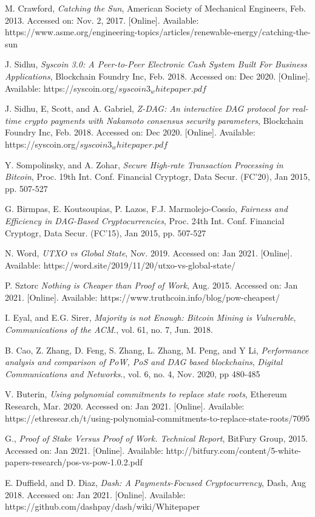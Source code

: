 \documentclass[peerreview]{ieeesyscoin}
\begin{document}
\begin{thebibliography}{00}


 M. Crawford, \textit{Catching the Sun}, American Society of Mechanical Engineers, Feb. 2013. Accessed on: Nov. 2, 2017. [Online]. Available: https://www.asme.org/engineering-topics/articles/renewable-energy/catching-the-sun


 J. Sidhu, \textit{Syscoin 3.0: A Peer-to-Peer Electronic Cash System Built For Business Applications}, Blockchain Foundry Inc, Feb. 2018. Accessed on: Dec 2020. [Online]. Available: https://syscoin.org/$syscoin3_whitepaper.pdf$

 J. Sidhu, E, Scott, and A. Gabriel, \textit{Z-DAG: An interactive DAG protocol for real-time crypto payments with Nakamoto consensus security parameters}, Blockchain Foundry Inc, Feb. 2018. Accessed on: Dec 2020. [Online]. Available: https://syscoin.org/$syscoin3_whitepaper.pdf$


 Y. Sompolinsky, and A. Zohar, \textit{Secure High-rate Transaction Processing in Bitcoin}, Proc. 19th Int. Conf. Financial Cryptogr, Data Secur. (FC’20), Jan 2015, pp. 507-527

 G. Birmpas, E. Koutsoupias, P. Lazos, F.J. Marmolejo-Cossío, \textit{Fairness and Efficiency in DAG-Based Cryptocurrencies}, Proc. 24th Int. Conf. Financial Cryptogr, Data Secur. (FC’15), Jan 2015, pp. 507-527


 N. Word, \textit{UTXO vs Global State}, Nov. 2019. Accessed on: Jan 2021. [Online]. Available: https://word.site/2019/11/20/utxo-vs-global-state/

 P. Sztorc \textit{Nothing is Cheaper than Proof of Work}, Aug. 2015. Accessed on: Jan 2021. [Online]. Available: https://www.truthcoin.info/blog/pow-cheapest/

 I. Eyal, and E.G. Sirer, \textit{Majority is not Enough: Bitcoin Mining is Vulnerable}, \emph{Communications of the ACM}., vol. 61, no. 7, Jun. 2018.

 B. Cao, Z. Zhang, D. Feng, S. Zhang, L. Zhang, M. Peng, and
Y Li, \textit{Performance analysis and comparison of PoW, PoS and DAG based blockchains}, \emph{Digital Communications and Networks}., vol. 6, no. 4, Nov. 2020, pp 480-485

 V. Buterin, \textit{Using polynomial commitments to replace state roots}, Ethereum Research, Mar. 2020. Accessed on: Jan 2021. [Online]. Available: https://ethresear.ch/t/using-polynomial-commitments-to-replace-state-roots/7095

 G., \textit{Proof of Stake Versus Proof of Work. Technical Report}, BitFury Group, 2015. Accessed on: Jan 2021. [Online]. Available: http://bitfury.com/content/5-white-papers-research/pos-vs-pow-1.0.2.pdf 


 E. Duffield, and D. Diaz, \textit{Dash: A Payments-Focused Cryptocurrency}, Dash, Aug 2018. Accessed on: Jan 2021. [Online]. Available: https://github.com/dashpay/dash/wiki/Whitepaper




\end{thebibliography}


\EOD
\end{document}
